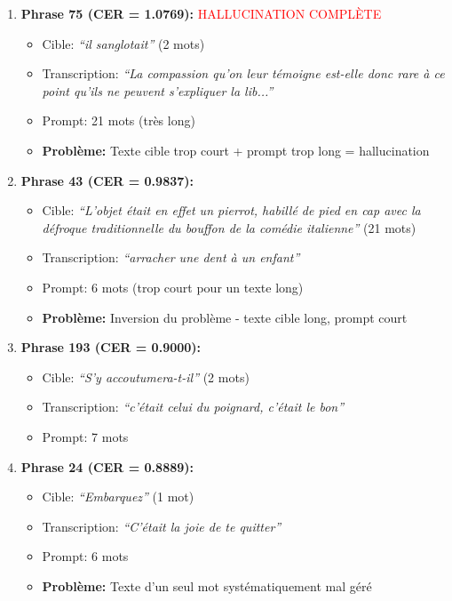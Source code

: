 \documentclass[12pt,a4paper]{article}
\begin{document}
\begin{enumerate}
    \item \textbf{Phrase 75 (CER = 1.0769):} \textcolor{red}{HALLUCINATION COMPLÈTE}
    \begin{itemize}
        \item Cible: \textit{``il sanglotait''} (2 mots)
        \item Transcription: \textit{``La compassion qu'on leur témoigne est-elle donc rare à ce point qu'ils ne peuvent s'expliquer la lib...''}
        \item Prompt: 21 mots (très long)
        \item \textbf{Problème:} Texte cible trop court + prompt trop long = hallucination
    \end{itemize}
    
    \item \textbf{Phrase 43 (CER = 0.9837):}
    \begin{itemize}
        \item Cible: \textit{``L'objet était en effet un pierrot, habillé de pied en cap avec la défroque traditionnelle du bouffon de la comédie italienne''} (21 mots)
        \item Transcription: \textit{``arracher une dent à un enfant''}
        \item Prompt: 6 mots (trop court pour un texte long)
        \item \textbf{Problème:} Inversion du problème - texte cible long, prompt court
    \end{itemize}
    
    \item \textbf{Phrase 193 (CER = 0.9000):}
    \begin{itemize}
        \item Cible: \textit{``S'y accoutumera-t-il''} (2 mots)
        \item Transcription: \textit{``c'était celui du poignard, c'était le bon''}
        \item Prompt: 7 mots
    \end{itemize}
    
    \item \textbf{Phrase 24 (CER = 0.8889):}
    \begin{itemize}
        \item Cible: \textit{``Embarquez''} (1 mot)
        \item Transcription: \textit{``C'était la joie de te quitter''}
        \item Prompt: 6 mots
        \item \textbf{Problème:} Texte d'un seul mot systématiquement mal géré
    \end{itemize}
    

\end{enumerate}
\end{document}
